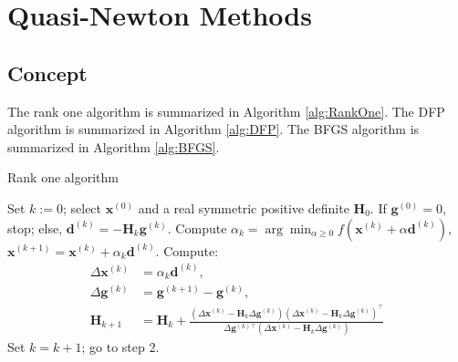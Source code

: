 \section{Quasi-Newton Methods}

\subsection{Concept}
The rank one algorithm is summarized in Algorithm \ref{alg:RankOne}. The DFP algorithm is summarized in Algorithm \ref{alg:DFP}. The BFGS algorithm is summarized in Algorithm \ref{alg:BFGS}.

\begin{algorithm}
\caption{Rank one algorithm} \label{alg:RankOne}
\begin{spacing}{1.5}
	\begin{algorithmic}[1]
		\State Set \( k := 0 \); select \( \boldsymbol{x}^{(0)} \) and a real symmetric positive definite \( \boldsymbol{H}_0 \).
		\State If \( \boldsymbol{g}^{(0)} = 0 \), stop; else, \( \boldsymbol{d}^{(k)} = -\boldsymbol{H}_k \boldsymbol{g}^{(k)} \).
		\State Compute \( \alpha_k = \arg \min_{\alpha \geq 0} f(\boldsymbol{x}^{(k)} + \alpha \boldsymbol{d}^{(k)}) \), \( \boldsymbol{x}^{(k+1)} = \boldsymbol{x}^{(k)} + \alpha_k \boldsymbol{d}^{(k)} \).
		\State Compute:
		\begin{align*}
			\Delta \boldsymbol{x}^{(k)} &= \alpha_k \boldsymbol{d}^{(k)}, \\
			\Delta \boldsymbol{g}^{(k)} &= \boldsymbol{g}^{(k+1)} - \boldsymbol{g}^{(k)}, \\
			\boldsymbol{H}_{k+1} &= \boldsymbol{H}_k + \frac{(\Delta \boldsymbol{x}^{(k)} - \boldsymbol{H}_k \Delta \boldsymbol{g}^{(k)}) (\Delta \boldsymbol{x}^{(k)} - \boldsymbol{H}_k \Delta \boldsymbol{g}^{(k)})^{\top}}{\Delta \boldsymbol{g}^{(k)\top} (\Delta \boldsymbol{x}^{(k)} - \boldsymbol{H}_k \Delta \boldsymbol{g}^{(k)})}
		\end{align*}
		\State Set \( k = k + 1 \); go to step 2.
	\end{algorithmic}
\end{spacing}
\end{algorithm}


